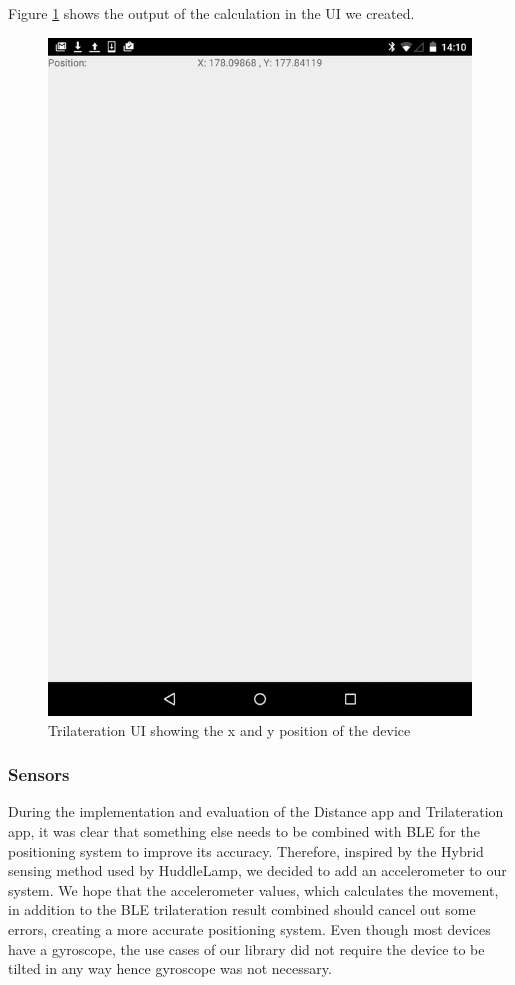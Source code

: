 Figure \ref{trilateration} shows the output of the calculation in the UI we created.
\begin{figure}[h]
\centering
  \includegraphics[scale=0.2]{images/trilateration}
  \protect\caption{Trilateration UI showing the x and y position of the device}
  \label{trilateration}
\end{figure}

\subsubsection{Sensors} \label{nocamera_sensors}
During the implementation and evaluation of the Distance app and Trilateration app, it was clear that something else needs to be combined with BLE for the positioning system to improve its accuracy. Therefore, inspired by the Hybrid sensing method used by HuddleLamp, we decided to add an accelerometer to our system. We hope that the accelerometer values, which calculates the movement, in addition to the BLE trilateration result combined should cancel out some errors, creating a more accurate positioning system. Even though most devices have a gyroscope, the use cases of our library did not require the device to be tilted in any way hence gyroscope was not necessary. 

